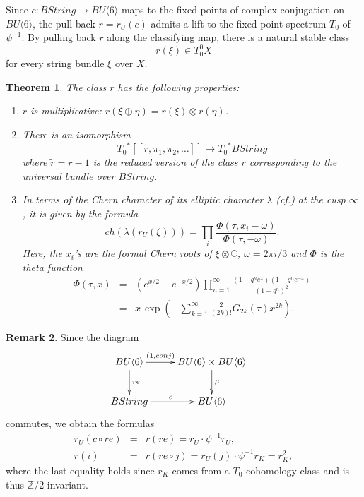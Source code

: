 \documentclass{amsart}
\newcommand {\Z}{{\mathbb Z}}
\newcommand {\C}{{\mathbb C}}
\newcommand{\lra}{\longrightarrow}              %
\numberwithin{equation}{section}
\newtheorem{thm}{Theorem}[section]
\theoremstyle{definition}  %
\newtheorem{set theory}[thm]{Set Theoretic Prelude}
\newtheorem{remark}[thm]{Remark}
\begin{document}
\bigskip

Since $c: BString\to BU\langle 6\rangle$ maps to the fixed points of complex conjugation on $BU\langle 6\rangle$, the pull-back $r=r_U(c)$ admits a lift to the fixed point spectrum $T_0$ of $\psi^{-1}$.
By pulling back $r$ along the classifying map, there is a natural stable class $$r(\xi) \in T_0^0 X$$  for every string bundle $\xi$ over $X$. 
\begin{thm}\cite{MR3448393}\label{2.4}
The class $r$ has 
the following properties:
\begin{enumerate}
\item
$r$ is multiplicative: $r(\xi\oplus \eta)=r(\xi)\otimes r(\eta)$.
\item
There is an isomorphism
$$ {T_0}^*[\![\tilde{r}, \pi _1,\pi _2,\ldots]\!] \lra {T_0}^*BString$$
where  $\tilde{r}=r-1$ is the reduced version of the class $r$ corresponding to the universal bundle over $BString$.
\item
In terms of the Chern character of its
elliptic character $\lambda$ (cf.\cite{MR1022688}) at the cusp $\infty$, it is given by the formula
$$ ch(\lambda (r_U(\xi))) = \prod_i\frac{\Phi(\tau,x_i-\omega)}{\Phi(\tau,-\omega)}.
$$
Here, the $x_i$'s are the formal Chern roots of $\xi\otimes \C$, $\omega =2\pi i/3$ and $\Phi$ is the theta function
\begin{eqnarray*}
\Phi(\tau,x)&=&(e^{x/2}-e^{-x/2})\prod_{n=1}^\infty \frac{(1-q^ne^x)(1-q^ne^{-x})}{(1-q^n)^2}
\\&=&x\, \exp(-\sum_{k=1}^\infty \frac{2}{(2k)!}G_{2k}(\tau)x^{2k}).
\end{eqnarray*}\end{enumerate}
\end{thm}
\begin{remark}
Since the diagram
\begin{eqnarray}\label{}
&\xymatrix{
BU\langle 6 \rangle
\ar[r]^-{(1,conj)}\ar[d]^{re}
&
BU\langle 6 \rangle\times BU\langle 6 \rangle
\ar[d]^\mu
\\
BString 
\ar[r]^c
&
BU\langle 6 \rangle
}&
\end{eqnarray}
commutes,
we obtain the formulas
\begin{eqnarray}
r_U(c\circ re)&=&r(re)=r_U\cdot \psi^{-1}r_U, \label{core}\\
r(i)&=&r(re\circ j)=r_U(j)\cdot \psi^{-1}r_K=r_K^2,
\end{eqnarray}
where the last equality holds since $r_K$ comes from a $T_0$-cohomology class and is thus $\Z/2$-invariant.
\end{remark}
\end{document}
